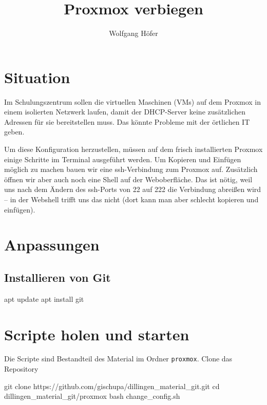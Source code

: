 \documentclass[
  letterpaper,
  DIV=11]{scrreprt}
\title{Proxmox verbiegen}
\author{Wolfgang Höfer}
\date{}
\newenvironment{Shaded}{\begin{snugshade}}{\end{snugshade}}
\newcommand{\BuiltInTok}[1]{\textcolor[rgb]{0.00,0.23,0.31}{#1}}
\newcommand{\ExtensionTok}[1]{\textcolor[rgb]{0.00,0.23,0.31}{#1}}
\newcommand{\FunctionTok}[1]{\textcolor[rgb]{0.28,0.35,0.67}{#1}}
\newcommand{\NormalTok}[1]{\textcolor[rgb]{0.00,0.23,0.31}{#1}}
\begin{document}
\maketitle


\section{Situation}\label{situation}

Im Schulungszentrum sollen die virtuellen Maschinen (VMs) auf dem
Proxmox in einem isolierten Netzwerk laufen, damit der DHCP-Server keine
zusätzlichen Adressen für sie bereitstellen muss. Das könnte Probleme
mit der örtlichen IT geben.

Um diese Konfiguration herzustellen, müssen auf dem frisch installierten
Proxmox einige Schritte im Terminal ausgeführt werden. Um Kopieren und
Einfügen möglich zu machen bauen wir eine ssh-Verbindung zum Proxmox
auf. Zusätzlich öffnen wir aber auch noch eine Shell auf der
Weboberfläche. Das ist nötig, weil\\
uns nach dem Ändern des ssh-Ports von 22 auf 222 die Verbindung abreißen
wird -- in der Webshell trifft uns das nicht (dort kann man aber
schlecht kopieren und einfügen).

\section{Anpassungen}\label{anpassungen}

\subsection{Installieren von Git}\label{installieren-von-git}

\begin{Shaded}
\begin{Highlighting}[]
\ExtensionTok{apt}\NormalTok{ update}
\ExtensionTok{apt}\NormalTok{ install git}
\end{Highlighting}
\end{Shaded}

\section{Scripte holen und starten}\label{scripte-holen-und-starten}

Die Scripte sind Bestandteil des Material im Ordner \texttt{proxmox}.
Clone das Repository

\begin{Shaded}
\begin{Highlighting}[]
\FunctionTok{git}\NormalTok{ clone https://github.com/gischupa/dillingen\_material\_git.git}
\BuiltInTok{cd}\NormalTok{ dillingen\_material\_git/proxmox}
\FunctionTok{bash}\NormalTok{ change\_config.sh}
\end{Highlighting}
\end{Shaded}
\end{document}
